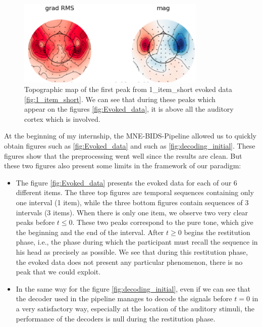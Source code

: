 \begin{figure}[ht]
    \centering
    \includegraphics[width=9cm]{images_report/sensor/auditory_cortex.png}
    \caption[Topographic map of the first peak from 1\_item\_short.]%
    {Topographic map of the first peak from 1\_item\_short evoked data \ref{fig:1_item_short}. We can see that during these peaks which appear on the figures \ref{fig:Evoked_data}, it is above all the auditory cortex which is involved.}
    \label{auditory_cortex}
\end{figure}

At the beginning of my internship, the MNE-BIDS-Pipeline allowed us to quickly obtain figures such as \ref{fig:Evoked_data} and such as \ref{fig:decoding_initial}. These figures show that the preprocessing went well since the results are clean. But these two figures also present some limits in the framework of our paradigm:

\begin{itemize}
    \item The figure \ref{fig:Evoked_data} presents the evoked data for each of our 6 different items. The three top figures are temporal sequences containing only one interval (1 item), while the three bottom figures contain sequences of 3 intervals (3 items).
          When there is only one item, we observe two very clear peaks before $t \leq 0$. These two peaks correspond to the pure tone, which give the beginning and the end of the interval. After $t \geq 0$ begins the restitution phase, i.e., the phase during which the participant must recall the sequence in his head as precisely as possible. We see that during this restitution phase, the evoked data does not present any particular phenomenon, there is no peak that we could exploit.
    \item In the same way for the figure \ref{fig:decoding_initial}, even if we can see that the decoder used in the pipeline manages to decode the signals before $t=0$ in a very satisfactory way, especially at the location of the auditory stimuli, the performance of the decoders is null during the restitution phase.
\end{itemize}

